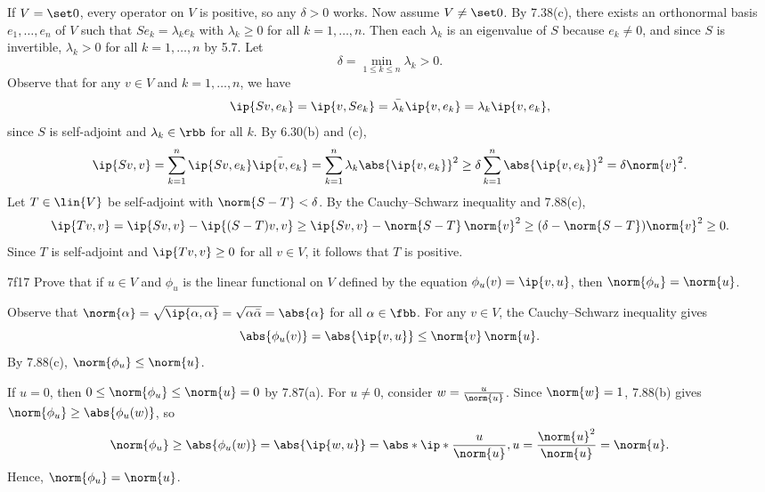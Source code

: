 \begin{sol}
    If $V = \set 0$, every operator on $V$ is positive, so any $\delta > 0$ works.
    Now assume $V \neq \set 0$.
    By 7.38(c), there exists an orthonormal basis $e_1, \ldots, e_n$ of $V$ such that $S e_k = \lambda_k e_k$ with $\lambda_k \geq 0$ for all $k = 1, \ldots, n$.
    Then each $\lambda_k$ is an eigenvalue of $S$ because $e_k \neq 0$, and since $S$ is invertible, $\lambda_k > 0$ for all $k = 1, \ldots, n$ by 5.7.
    Let
    \[
        \delta = \min_{1 \leq k \leq n} \lambda_k > 0.
    \]
    Observe that for any $v \in V$ and $k = 1, \ldots, n$, we have
    \[
        \ip{Sv, e_k} = \ip{v, S e_k} = \bar{\lambda_k} \ip{v, e_k} = \lambda_k \ip{v, e_k},
    \]
    since $S$ is self-adjoint and $\lambda_k \in \rbb$ for all $k$.
    By 6.30(b) and (c),
    \[
        \ip{Sv, v} = \sum_{k=1}^n \ip{S v, e_k} \bar{\ip{v, e_k}} = \sum_{k=1}^n \lambda_k \abs{\ip{v, e_k}}^2 \geq \delta \sum_{k=1}^n \abs{\ip{v, e_k}}^2 = \delta \norm{v}^2.
    \]
    Let $T \in \lin{V}$ be self-adjoint with $\norm{S - T} < \delta$.
    By the Cauchy--Schwarz inequality and 7.88(c),
    \[
        \ip{Tv, v} = \ip{Sv, v} - \ip{(S - T)v, v} \geq \ip{Sv, v} - \norm{S - T}\,\norm{v}^2 \geq (\delta - \norm{S - T}) \norm{v}^2 \geq 0.
    \]
    Since $T$ is self-adjoint and $\ip{Tv, v} \geq 0$ for all $v \in V$, it follows that $T$ is positive.
\end{sol}

\begin{exercise}{7f17}
    Prove that if $u \in V$ and $\phi_u$ is the linear functional on $V$ defined by the equation $\phi_u(v) = \ip{v, u}$, then $\norm{\phi_u} = \norm{u}$.

\end{exercise}

\begin{sol}
    Observe that $\norm{\alpha} = \sqrt{\ip{\alpha, \alpha}} = \sqrt{\alpha \bar{\alpha}} = \abs{\alpha}$ for all $\alpha \in \fbb$.
    For any $v \in V$, the Cauchy--Schwarz inequality gives
    \[
        \abs{\phi_u(v)} = \abs{\ip{v, u}} \leq \norm{v}\,\norm{u}.
    \]
    By 7.88(c), $\norm{\phi_u} \leq \norm{u}$.

    If $u = 0$, then $0 \leq \norm{\phi_u} \leq \norm{u} = 0$ by 7.87(a).
    For $u \neq 0$, consider $w = \frac{u}{\norm{u}}$.
    Since $\norm{w} = 1$, 7.88(b) gives $\norm{\phi_u} \geq \abs{\phi_u(w)}$, so
    \[
        \norm{\phi_u} \geq \abs{\phi_u(w)} = \abs{\ip{w, u}} = \abs*{\ip*{\frac{u}{\norm{u}}, u}} = \frac{\norm{u}^2}{\norm{u}} = \norm{u}.
    \]
    Hence, $\norm{\phi_u} = \norm{u}$.
\end{sol}

